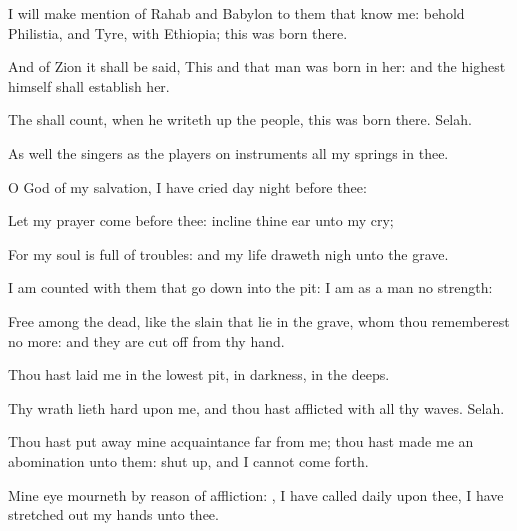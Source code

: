 {\Q {}I will make
mention of
Rahab and
Babylon to them that
know me: behold
Philistia, and
Tyre, with
Ethiopia; this
{} was
born there.


\par }{\Q {}And of
Zion it shall be
said, This and that
man was
born in her: and the
highest himself shall
establish her.


\par }{\Q {}The
{} shall
count, when he writeth
up the
people,
{} this
{} was
born there.
Selah.


\par }{\Q {}As well the
singers as the
players on instruments
{} all my
springs
{} in thee.




\par }
{\Q {}O
{}
God of my
salvation, I have
cried
day
{}
night before thee:


\par }{\Q {}Let my
prayer
come
before thee:
incline thine
ear unto my
cry;


\par }{\Q {}For my
soul is
full of
troubles: and my
life draweth
nigh unto the
grave.


\par }{\Q {}I am
counted with them that go
down into the
pit: I am as a
man
{} no
strength:


\par }{\Q {}Free among the
dead, like the
slain that
lie in the
grave, whom thou
rememberest no more: and they are cut
off from thy
hand.


\par }{\Q {}Thou hast
laid me in the
lowest
pit, in
darkness, in the
deeps.


\par }{\Q {}Thy
wrath lieth
hard upon me, and thou hast
afflicted
{} with all thy
waves.
Selah.


\par }{\Q {}Thou hast put
away mine
acquaintance
far from me; thou hast
made me an
abomination unto them:
{} shut
up, and I cannot come
forth.


\par }{\Q {}Mine
eye
mourneth by reason of
affliction:
{}, I have
called
daily upon thee, I have stretched
out my
hands unto thee.


\par }{\BB \par }
